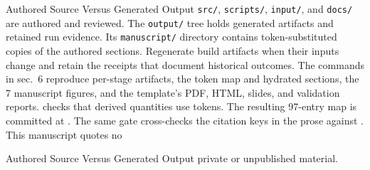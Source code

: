 \documentclass[
  ignorenonframetext,
]{beamer}
\begin{document}
\begin{frame}{Authored Source Versus Generated
Output}
\protect{}\label{authored-source-versus-generated-output}
\texttt{src/}, \texttt{scripts/}, \texttt{input/}, and \texttt{docs/}
are authored and reviewed. The \texttt{output/} tree holds generated
artifacts and retained run evidence. Its \texttt{manuscript/} directory
contains token-substituted copies of the authored
 sections. Regenerate build artifacts when
their inputs change and retain the receipts that document historical
outcomes. The commands in sec.~6 reproduce
per-stage artifacts, the token map and hydrated sections, the 7
manuscript figures, and the template's PDF, HTML, slides, and validation
reports.  checks that
derived quantities use tokens. The resulting 97-entry map is committed
at . The same gate
cross-checks the citation keys in the prose against
. This manuscript quotes no
\end{frame}

\begin{frame}{Authored Source Versus Generated
Output}
private or unpublished material.
\end{frame}
\end{document}
